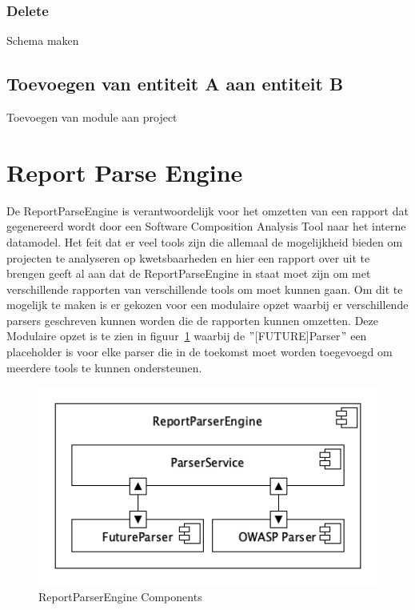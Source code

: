\subsubsection*{Delete}Schema maken

\subsection{Toevoegen van entiteit A aan entiteit B}\label{subsec:toevoegen-van-entiteit-a-aan-entiteit-b}
Toevoegen van module aan project



\section{Report Parse Engine}
De ReportParseEngine is verantwoordelijk voor het omzetten van een rapport dat gegenereerd wordt door een Software Composition Analysis Tool naar het interne datamodel. Het feit dat er veel tools zijn die allemaal de mogelijkheid bieden om projecten te analyseren op kwetsbaarheden en hier een rapport over uit te brengen geeft al aan dat de ReportParseEngine in staat moet zijn om met verschillende rapporten van verschillende tools om moet kunnen gaan. Om dit te mogelijk te maken is er gekozen voor een modulaire opzet waarbij er verschillende parsers geschreven kunnen worden die de rapporten kunnen omzetten. Deze Modulaire opzet is te zien in figuur~\ref{fig:ReportParserComponents} waarbij de $"$[FUTURE]Parser$"$ een placeholder is voor elke parser die in de toekomst moet worden toegevoegd om meerdere tools te kunnen ondersteunen.
\begin{figure}[bth]
    \myfloatalign
    \includegraphics[width=12cm]{gfx/umlet/exports/ReportParserComponents}
    \caption{ReportParserEngine Components}
    \label{fig:ReportParserComponents}
\end{figure}



